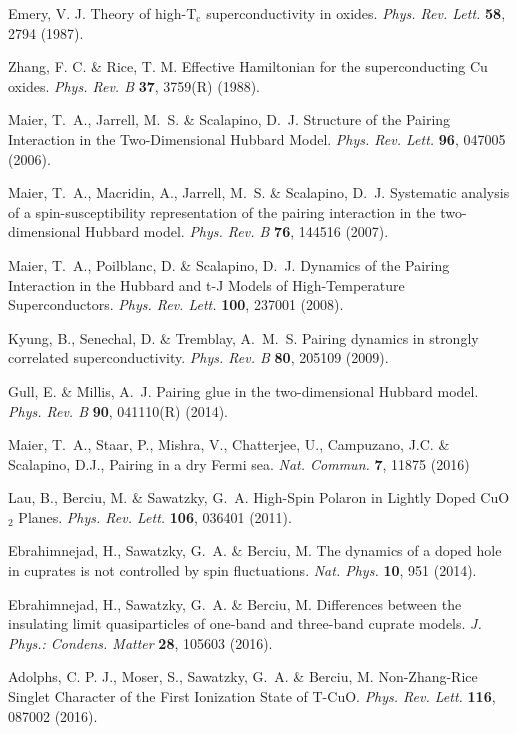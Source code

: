 \documentclass[fleqn,twocolumn,11pt]{wlscirep}
\begin{document}
\begin{thebibliography}{99}
Emery, V. J. Theory of high-T$_\mathrm{c}$ superconductivity in oxides. 
\textit{Phys. Rev. Lett.} {\bf 58}, 2794 (1987). 

Zhang, F. C. \& Rice, T. M. Effective Hamiltonian for the superconducting Cu oxides. \textit{Phys. Rev. B}  {\bf 37}, 3759(R) (1988).

 Maier, T.~A., Jarrell, M.~S. \& Scalapino, D.~J. Structure of the Pairing Interaction in the Two-Dimensional Hubbard Model. \textit{Phys. Rev. Lett.} {\bf 96}, 047005 (2006).

 Maier, T.~A., Macridin, A., Jarrell, M.~S. \& Scalapino, D.~J. Systematic analysis of a spin-susceptibility representation of the pairing interaction in the two-dimensional Hubbard model. \textit{Phys. Rev. B} {\bf 76}, 144516 (2007).

 Maier, T.~A., Poilblanc, D. \& Scalapino, D.~J. Dynamics of the Pairing Interaction in the Hubbard and t-J Models of High-Temperature Superconductors. \textit{Phys. Rev. Lett.} {\bf 100}, 237001 (2008).

 Kyung, B., Senechal, D. \& Tremblay, A.~M.~S. Pairing dynamics in strongly correlated superconductivity.
 \textit{Phys. Rev. B} {\bf 80}, 205109 (2009).

 Gull, E. \& Millis, A.~J.
Pairing glue in the two-dimensional Hubbard model. \textit{Phys. Rev. B} {\bf 90}, 041110(R) (2014).

 Maier, T.~A., Staar, P., Mishra, V., Chatterjee, U., Campuzano, J.C. \&  Scalapino, D.J., Pairing in a dry Fermi sea. \textit{Nat. Commun.} {\bf 7}, 11875 (2016)

 Lau, B., Berciu, M. \& Sawatzky, G.~A. 
High-Spin Polaron in Lightly Doped CuO$_2$ Planes.  \textit{Phys. Rev. Lett.}  {\bf 106}, 036401 (2011).

 Ebrahimnejad, H., Sawatzky, G.~A. \& Berciu, M. The dynamics of a doped hole in cuprates is not controlled by spin fluctuations. \textit{ Nat. Phys.} {\bf 10}, 951 (2014).

 Ebrahimnejad, H., Sawatzky, G.~A. \& Berciu, M. Differences between the insulating limit quasiparticles of one-band and three-band cuprate models.
\textit{ J. Phys.: Condens. Matter} {\bf 28}, 105603 (2016).

 Adolphs, C. P. J., Moser, S., Sawatzky, G.~A. \& Berciu, M. Non-Zhang-Rice Singlet Character of the First Ionization State of T-CuO. \textit{Phys. Rev. Lett.} {\bf 116}, 087002 (2016).


\end{thebibliography}
\end{document}
